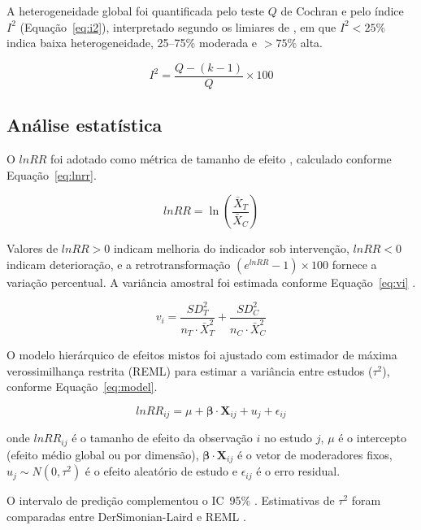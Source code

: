 \documentclass[12pt,a4paper]{article}
\begin{document}
A heterogeneidade global foi quantificada pelo teste $Q$ de Cochran e pelo índice $I^2$ (Equação~\ref{eq:i2}), interpretado segundo os limiares de \citet{Higgins2003}, em que $I^2 < 25\%$ indica baixa heterogeneidade, 25--75\% moderada e $> 75\%$ alta.

\begin{equation}
I^2 = \frac{Q - (k-1)}{Q} \times 100
\label{eq:i2}
\end{equation}

\subsection{Análise estatística}
\label{sec:stats}

O $lnRR$ foi adotado como métrica de tamanho de efeito \citep{Hedges1999}, calculado conforme Equação~\ref{eq:lnrr}.

\begin{equation}
lnRR = \ln\left(\frac{\bar{X}_{T}}{\bar{X}_{C}}\right)
\label{eq:lnrr}
\end{equation}

\noindent Valores de $lnRR > 0$ indicam melhoria do indicador sob intervenção, $lnRR < 0$ indicam deterioração, e a retrotransformação $(e^{lnRR} - 1) \times 100$ fornece a variação percentual. A variância amostral foi estimada conforme Equação~\ref{eq:vi} \citep{Hedges1999}.

\begin{equation}
v_i = \frac{SD_T^2}{n_T \cdot \bar{X}_T^2} + \frac{SD_C^2}{n_C \cdot \bar{X}_C^2}
\label{eq:vi}
\end{equation}

O modelo hierárquico de efeitos mistos foi ajustado com estimador de máxima verossimilhança restrita (REML) para estimar a variância entre estudos ($\tau^2$), conforme Equação~\ref{eq:model}.

\begin{equation}
lnRR_{ij} = \mu + \bm{\beta} \cdot \mathbf{X}_{ij} + u_j + \epsilon_{ij}
\label{eq:model}
\end{equation}

\noindent onde $lnRR_{ij}$ é o tamanho de efeito da observação $i$ no estudo $j$, $\mu$ é o intercepto (efeito médio global ou por dimensão), $\bm{\beta} \cdot \mathbf{X}_{ij}$ é o vetor de moderadores fixos, $u_j \sim N(0, \tau^2)$ é o efeito aleatório de estudo e $\epsilon_{ij}$ é o erro residual.

O intervalo de predição complementou o IC~95\% \citep{IntHout2016}. Estimativas de $\tau^2$ foram comparadas entre DerSimonian-Laird e REML \citep{Borenstein2009}.
\end{document}
